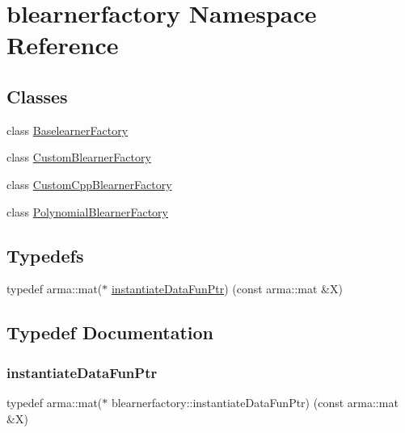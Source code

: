 \hypertarget{namespaceblearnerfactory}{}\section{blearnerfactory Namespace Reference}
\label{namespaceblearnerfactory}
\subsection*{Classes}
\begin{DoxyCompactItemize}
\item 
class \mbox{\hyperlink{classblearnerfactory_1_1_baselearner_factory}{Baselearner\+Factory}}
\item 
class \mbox{\hyperlink{classblearnerfactory_1_1_custom_blearner_factory}{Custom\+Blearner\+Factory}}
\item 
class \mbox{\hyperlink{classblearnerfactory_1_1_custom_cpp_blearner_factory}{Custom\+Cpp\+Blearner\+Factory}}
\item 
class \mbox{\hyperlink{classblearnerfactory_1_1_polynomial_blearner_factory}{Polynomial\+Blearner\+Factory}}
\end{DoxyCompactItemize}
\subsection*{Typedefs}
\begin{DoxyCompactItemize}
\item 
typedef arma\+::mat($\ast$ \mbox{\hyperlink{namespaceblearnerfactory_a74e80c9723f4fa8866e09a04dfa3035b}{instantiate\+Data\+Fun\+Ptr}}) (const arma\+::mat \&X)
\end{DoxyCompactItemize}


\subsection{Typedef Documentation}
\mbox{\label{namespaceblearnerfactory_a74e80c9723f4fa8866e09a04dfa3035b}} 
\subsubsection{\texorpdfstring{instantiate\+Data\+Fun\+Ptr}{instantiateDataFunPtr}}
{\footnotesize\ttfamily typedef arma\+::mat($\ast$ blearnerfactory\+::instantiate\+Data\+Fun\+Ptr) (const arma\+::mat \&X)}

